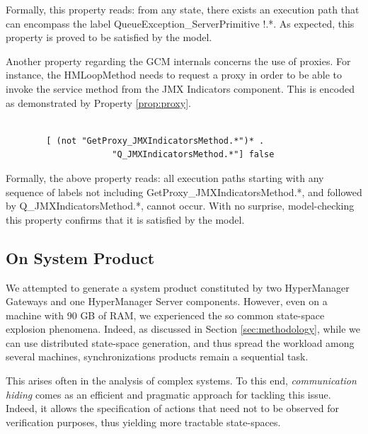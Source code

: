 	\noindent Formally, this property reads: from any state, there exists an execution path that can encompass the label
	\textsf{QueueException\_ServerPrimitive !.*}. As expected, this property is proved to be satisfied by the model.
	
		Another property regarding the \ac{GCM} internals concerns the use of proxies. For instance,
	the \textsf{HMLoopMethod} needs to request
	a proxy in order to be able to invoke the service method from the \textsf{JMX Indicators} component. 
	This is encoded as demonstrated by Property \ref{prop:proxy}.
	
	 \begin{property}
	\label{prop:proxy}	 
	 
	\begin{verbatim}
	
		[ (not "GetProxy_JMXIndicatorsMethod.*")* . 
		             "Q_JMXIndicatorsMethod.*"] false
	\end{verbatim}
   \end{property}
   
   \noindent Formally, the above property reads: all execution paths starting with any sequence of labels not including
   \textsf{GetProxy\_JMXIndicatorsMethod.*}, and followed by \textsf{Q\_JMXIndicatorsMethod.*}, cannot occur.
    With no surprise, model-checking this property confirms that it is satisfied by the model.
	    
\subsection{On System Product}
\label{sub:prod1}

 
 	
	We attempted to generate a system product constituted by two \textsf{HyperManager Gateway}s and 
	one \textsf{HyperManager Server} components. However, even on a machine with 90 GB of RAM, we experienced
	the so common state-space explosion phenomena. Indeed, as discussed in Section \ref{sec:methodology},
	while we can use distributed state-space generation, and thus spread the workload among several machines,
	synchronizations products remain a sequential task. 
	
	This arises often in the analysis of complex systems. To this end, \textit{communication hiding} 	
	comes as an efficient and pragmatic approach for tackling this issue. Indeed, it allows the specification of 
	actions that need not to be observed for verification purposes, thus yielding
	more tractable state-spaces.
	
